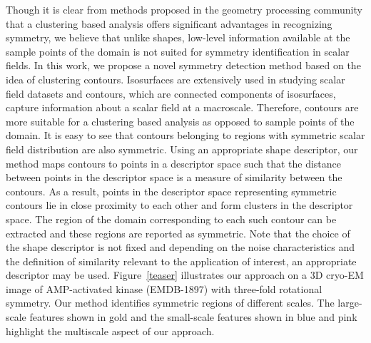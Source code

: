 \documentclass[review,journal]{vgtc}         %
\begin{document}
Though it is clear from methods proposed in the geometry processing community
that a clustering based analysis offers significant advantages in recognizing symmetry,
we believe that unlike shapes, low-level information available at the sample points of the 
domain is not suited for symmetry identification in scalar fields. In this work, we propose 
a novel symmetry detection method based on the idea of clustering contours. Isosurfaces
are extensively used in studying scalar field datasets and contours, which are 
connected components of isosurfaces, capture information 
about a scalar field at a macroscale.
Therefore, contours are more suitable for a clustering based analysis as opposed to sample 
points of the domain. It is easy to see that contours
belonging to regions with symmetric scalar field distribution are also symmetric. Using an 
appropriate shape descriptor, our method maps contours to points in a descriptor space 
such that the distance between points in the descriptor space is a measure of similarity 
between the contours. As a result, points in the descriptor space 
representing symmetric contours lie in close 
proximity to each other and form clusters in the descriptor space. The region of the domain
corresponding to each such contour can be extracted and these regions
are reported as symmetric. Note that the choice
of the shape descriptor is not fixed and depending on the noise characteristics and the definition
of similarity relevant to the application of interest, an appropriate descriptor may be used.
Figure~\ref{teaser} illustrates our approach on a 3D cryo-EM image of AMP-activated kinase (EMDB-1897) 
with three-fold rotational symmetry. {\color{blue}Our method identifies symmetric regions of different
scales. The large-scale features shown in gold and the small-scale features shown in blue and pink
highlight the multiscale aspect of our approach.}
\end{document}
